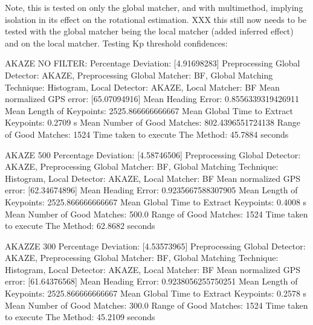 Note, this is tested on only the global matcher, and with multimethod, implying isolation in its effect on the rotational estimation. XXX this still now needs to be tested with the global matcher being the local matcher (added inferred effect) and on the local matcher. 
    Testing Kp threshold confidences:



    
AKAZE NO FILTER:
Percentage Deviation: [4.91698283] %
Preprocessing Global Detector: AKAZE, Preprocessing Global Matcher: BF, Global Matching Technique: Histogram, Local Detector: AKAZE, Local Matcher: BF
Mean normalized GPS error: [65.07094916]
 Mean Heading Error: 0.8556339319426911
Mean Length of Keypoints: 2525.866666666667
Mean Global Time to Extract Keypoints: 0.2709 s
Mean Number of Good Matches: 802.4396551724138
Range of Good Matches: 1524
Time taken to execute The Method: 45.7884 seconds

AKAZE 500
Percentage Deviation: [4.58746506] %
Preprocessing Global Detector: AKAZE, Preprocessing Global Matcher: BF, Global Matching Technique: Histogram, Local Detector: AKAZE, Local Matcher: BF
Mean normalized GPS error: [62.34674896]
 Mean Heading Error: 0.9235667588307905
Mean Length of Keypoints: 2525.866666666667
Mean Global Time to Extract Keypoints: 0.4008 s
Mean Number of Good Matches: 500.0
Range of Good Matches: 1524
Time taken to execute The Method: 62.8682 seconds



AKAZZE 300
Percentage Deviation: [4.53573965] %
Preprocessing Global Detector: AKAZE, Preprocessing Global Matcher: BF, Global Matching Technique: Histogram, Local Detector: AKAZE, Local Matcher: BF
Mean normalized GPS error: [61.64376568]
 Mean Heading Error: 0.9238056255750251
Mean Length of Keypoints: 2525.866666666667
Mean Global Time to Extract Keypoints: 0.2578 s
Mean Number of Good Matches: 300.0
Range of Good Matches: 1524
Time taken to execute The Method: 45.2109 seconds




